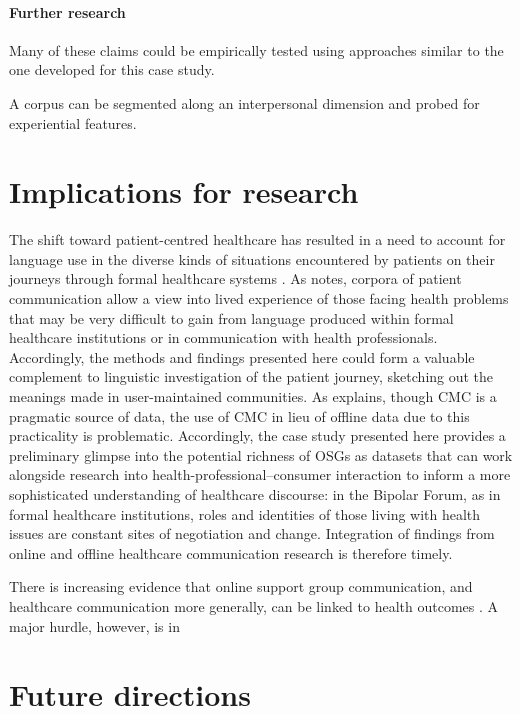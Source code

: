 \paragraph{Further research}

Many of these claims could be empirically tested using approaches similar to the one developed for this case study.

A corpus can be segmented along an interpersonal dimension and probed for experiential features.



\section{Implications for  research}

The shift toward patient-centred healthcare has resulted in a need to account for language use in the diverse kinds of situations encountered by patients on their journeys through formal healthcare systems \cite{matthiessen_applying_2013,slade_emergency_2008}. As \textcite{harvey_disclosures_2012} notes, corpora of patient communication allow a view into lived experience of those facing health problems that may be very difficult to gain from language produced within formal healthcare institutions or in communication with health professionals. Accordingly, the methods and findings presented here could form a valuable complement to linguistic investigation of the patient journey, sketching out the meanings made in user-maintained communities. As \textcite{virtanen_discourse_2009} explains, though \gls{CMC} is a pragmatic source of data, the use of \gls{CMC} in lieu of offline data due to this practicality is problematic. Accordingly, the case study presented here provides a preliminary glimpse into the potential richness of OSGs as datasets that can work alongside research into health\hyp{}professional--consumer interaction to inform a more sophisticated understanding of healthcare discourse: in the Bipolar Forum, as in formal healthcare institutions, roles and identities of those living with health issues are constant sites of negotiation and change. Integration of findings from online and offline healthcare communication research is therefore timely.

    There is increasing evidence that online support group communication, and healthcare communication more generally, can be linked to health outcomes \cite{mayfield_automating_2014}. A major hurdle, however, is in 

\section{Future directions}

